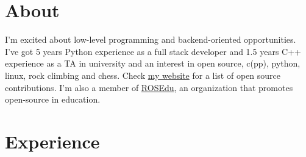 \documentclass[line, margin]{resume}
\begin{document}
\renewcommand{\namefont}{ \LARGE \bf }


\address{\href{mailto:andrei@linux.com}{andrei@linux.com}}
\address{\href{http://andreipetre.ro}{andreipetre.ro}}

\begin{resume}



    \section{About}

I'm excited about low-level programming and backend-oriented opportunities. I've got 5 years Python experience as a full stack developer and 1.5 years C++ experience as a TA in university and an interest in open source, c(pp), python, linux, rock climbing and chess. Check \href{http://andreipetre.ro}{my website} for a list of open source contributions. I'm also a member of \href{http://rosedu.org}{ROSEdu}, an organization that promotes open-source in education.

\section{Experience}


\end{resume}
\end{document}
